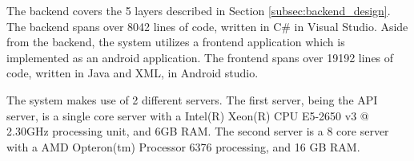 The backend covers the 5 layers described in Section \ref{subsec:backend_design}. The backend spans over 8042 lines of code, written in C\# in Visual Studio. Aside from the backend, the system utilizes a frontend application which is implemented as an android application. The frontend spans over 19192 lines of code, written in Java and XML, in Android studio.

The system  makes use of 2 different servers. The first server, being the API server, is a single core server with a Intel(R) Xeon(R) CPU E5-2650 v3 @ 2.30GHz processing unit, and 6GB RAM. The second server is a 8 core server with a AMD Opteron(tm) Processor 6376 processing, and 16 GB RAM.